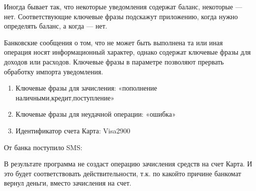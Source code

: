 \documentclass[a4paper,10pt,russian]{sphinxmanual}
\begin{document}
\noindent{}
\noindent{}

\sphinxAtStartPar
Иногда бывает так, что некоторые уведомления содержат баланс, некоторые — нет. Соответствующие ключевые фразы
подскажут приложению, когда нужно определять баланс, а когда — нет.

\sphinxAtStartPar
Банковские сообщения о том, что не может быть выполнена та или иная операция носят информационный характер,
однако содержат ключевые фразы для доходов или расходов. Ключевые фразы в параметре  позволяют
прервать обработку импорта уведомления.
\begin{description}
\begin{enumerate}
%
\item {} 
\sphinxAtStartPar
Ключевые фразы для зачисления: «пополнение наличными,кредит,поступление»

\item {} 
\sphinxAtStartPar
Ключевые фразы для неудачной операции: «ошибка»

\item {} 
\sphinxAtStartPar
Идентификатор счета Карта: Visa2900

\end{enumerate}

\end{description}

\sphinxAtStartPar
От банка поступило SMS:

\begin{sphinxVerbatim}[commandchars=\\\{\}]
           
\end{sphinxVerbatim}

\sphinxAtStartPar
В результате программа не создаст операцию зачисления средств на счет Карта. И это будет соответствовать действительности,
т.к. по какой\sphinxhyphen{}то причине банкомат вернул деньги, вместо зачисления на счет.
\end{document}
